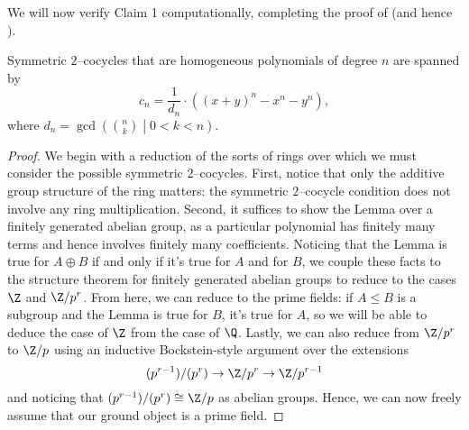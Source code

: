 We will now verify Claim 1 computationally, completing the proof of  (and hence ).

\begin{lemma}\label{Symmetric2CocycleLemma}
Symmetric $2$--cocycles that are homogeneous polynomials of degree $n$ are spanned by \[c_n = \frac{1}{d_n} \cdot ((x + y)^n - x^n - y^n),\] where $d_n = \gcd\left( \binom{n}{k} \middle| 0 < k < n \right)$.
\end{lemma}
\begin{proof}
We begin with a reduction of the sorts of rings over which we must consider the possible symmetric $2$--cocycles.  First, notice that only the additive group structure of the ring matters: the symmetric $2$--cocycle condition does not involve any ring multiplication.  Second, it suffices to show the Lemma over a finitely generated abelian group, as a particular polynomial has finitely many terms and hence involves finitely many coefficients.  Noticing that the Lemma is true for $A \oplus B$ if and only if it's true for $A$ and for $B$, we couple these facts to the structure theorem for finitely generated abelian groups to reduce to the cases $\Z$ and $\Z/p^r$.  From here, we can reduce to the prime fields: if $A \le B$ is a subgroup and the Lemma is true for $B$, it's true for $A$, so we will be able to deduce the case of $\Z$ from the case of $\Q$.  Lastly, we can also reduce from $\Z/p^r$ to $\Z/p$ using an inductive Bockstein-style argument over the extensions \[(p^{r-1}) / (p^r) \to \Z/p^r \to \Z/p^{r-1}\] and noticing that $(p^{r-1}) / (p^r) \cong \Z/p$ as abelian groups.  Hence, we can now freely assume that our ground object is a prime field.


\end{proof}
